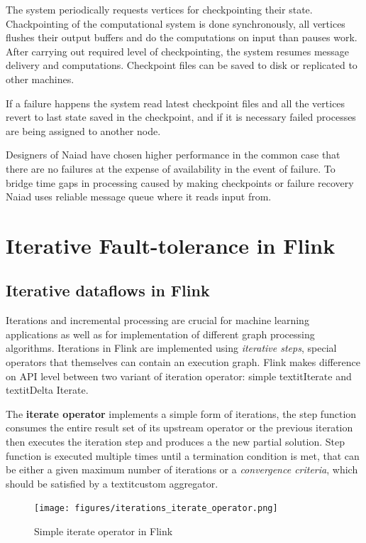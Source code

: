 The system periodically requests vertices for checkpointing their state. Chackpointing of the computational system is done synchronously,  all vertices flushes their output buffers and do the computations on input than pauses work. After carrying out required level of checkpointing, the system resumes message delivery and computations. Checkpoint files can be saved to disk or replicated to other machines.

If a failure happens the system read latest checkpoint files and  all the vertices revert to last state saved in the checkpoint, and if it is necessary failed processes are being assigned to another node.

Designers of Naiad have chosen higher performance in the common case that there are no failures at the expense of availability in the event of failure. To bridge time gaps in processing caused by making checkpoints or failure recovery Naiad uses reliable message queue where it reads input from. 

\section{Iterative Fault-tolerance in Flink}
\subsection{Iterative dataflows in Flink}
Iterations and incremental processing are crucial for machine learning applications as well as for implementation of different graph processing algorithms. Iterations in Flink are implemented using \textit{iterative steps}, special operators that themselves can contain an execution graph. Flink makes difference on API level between two variant of iteration operator: simple textit{Iterate} and textit{Delta Iterate}.

The \textbf{iterate operator} implements a simple form of iterations, the step function consumes the entire result set of its upstream operator or the previous iteration then executes the iteration step and produces a the new partial solution. Step function is executed multiple times until a termination condition is met, that can be either a given maximum number of iterations or a \textit{convergence criteria}, which should be satisfied by a textit{custom aggregator}.
\begin{figure}[!ht]
  \centering    
      \texttt{[image: figures/iterations\_iterate\_operator.png]}
  \caption{Simple iterate operator in Flink\cite{flink_doc_iteration}}
  \label{fig:iterations_iterate_operator}
\end{figure}

